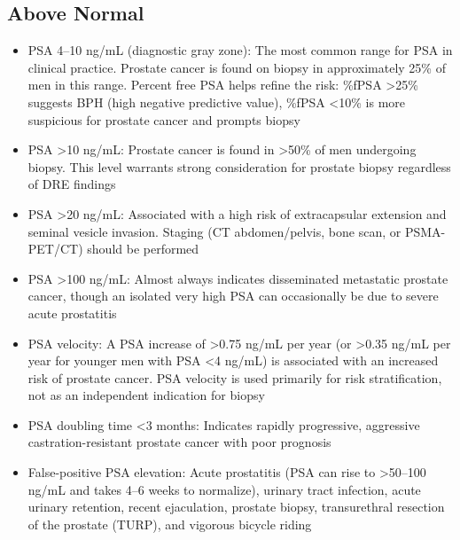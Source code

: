 \subsection*{Above Normal}
\begin{itemize}
  \item PSA 4--10 ng/mL (diagnostic gray zone): The most common range for PSA in clinical practice. Prostate cancer is found on biopsy in approximately 25\% of men in this range. Percent free PSA helps refine the risk: \%fPSA >25\% suggests BPH (high negative predictive value), \%fPSA <10\% is more suspicious for prostate cancer and prompts biopsy
  \item PSA >10 ng/mL: Prostate cancer is found in >50\% of men undergoing biopsy. This level warrants strong consideration for prostate biopsy regardless of DRE findings
  \item PSA >20 ng/mL: Associated with a high risk of extracapsular extension and seminal vesicle invasion. Staging (CT abdomen/pelvis, bone scan, or PSMA-PET/CT) should be performed
  \item PSA >100 ng/mL: Almost always indicates disseminated metastatic prostate cancer, though an isolated very high PSA can occasionally be due to severe acute prostatitis
  \item PSA velocity: A PSA increase of >0.75 ng/mL per year (or >0.35 ng/mL per year for younger men with PSA <4 ng/mL) is associated with an increased risk of prostate cancer. PSA velocity is used primarily for risk stratification, not as an independent indication for biopsy
  \item PSA doubling time <3 months: Indicates rapidly progressive, aggressive castration-resistant prostate cancer with poor prognosis
  \item False-positive PSA elevation: Acute prostatitis (PSA can rise to >50--100 ng/mL and takes 4--6 weeks to normalize), urinary tract infection, acute urinary retention, recent ejaculation, prostate biopsy, transurethral resection of the prostate (TURP), and vigorous bicycle riding
\end{itemize}

